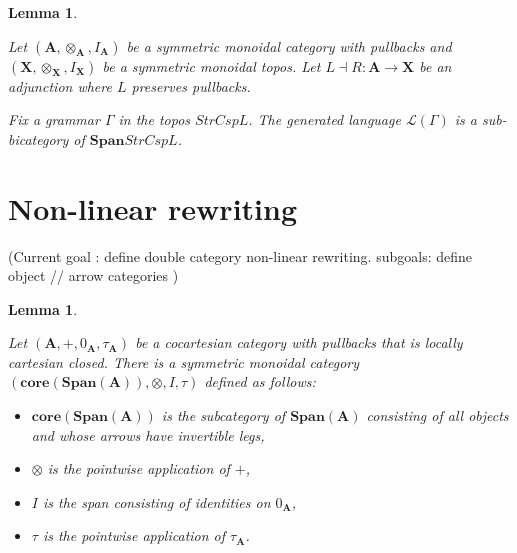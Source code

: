 \documentclass{amsart}
\newcommand{\A}{\cat{A}}
\newcommand{\X}{\cat{X}}
\newcommand{\core}{\mathbf{core}}
\newcommand{\cat}[1]{\mathbf{#1}}
\newcommand{\from}{\colon}
\newcommand{\Span}{\mathbf{Span}}
\newcommand{\edit}[1]{\textcolor{editcolour}{(#1)}}
\newtheorem{lemma}[theorem]{Lemma}
\theoremstyle{remark}
\theoremstyle{definition}
\begin{document}
\begin{lemma}
  \label{thm:dpo_open-objects-language}
	
  Let $ (\A , \otimes_{\A} , I_{\A}) $ be a symmetric monoidal
  category with pullbacks and $ (\X , \otimes_{\X} , I_{\X}) $ be a
  symmetric monoidal topos.  Let $ L \dashv R \from \A \to \X $ be an
  adjunction where $ L $ preserves pullbacks.
	
  Fix a grammar $ \Gamma $ in the topos $ StrCsp{L} $.  The generated
  language $ \mathcal{L}(\Gamma) $ is a sub-bicategory of
  $ \Span StrCsp {L} $.
  
\end{lemma}


\section{Non-linear rewriting} \label{sec:non-linear-rewriting}

\edit{Current goal : define double category non-linear
  rewriting. subgoals: define object // arrow categories }

\begin{lemma} \label{thm_dbl-rewr-obcat}

  Let $ (\A , + , 0_\A , \tau_\A ) $ be a cocartesian category with
  pullbacks that is locally cartesian closed. There is a symmetric
  monoidal category $ ( \core (\Span (\A)) , \otimes , I , \tau ) $
  defined as follows:

  \begin{itemize}
    \item $ \core (\Span (\A)) $ is the subcategory of $ \Span (\A) $
      consisting of all objects and whose arrows have invertible legs,
    \item $ \otimes $ is the pointwise application of $ + $,
    \item $ I $ is the span consisting of identities on $ 0_{\A} $,
    \item $ \tau $ is the pointwise application of $ \tau_{\A} $.
  \end{itemize}
    
\end{lemma}
\end{document}
